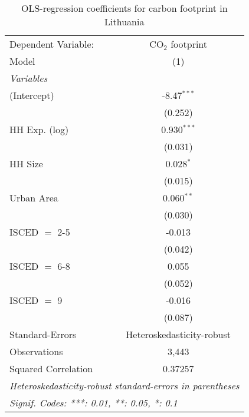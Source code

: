
\begin{table}[htbp!]
   \centering
   \small
   \begin{adjustbox}{width = 1\textwidth, max height = 0.95\textheight, center}
      \begin{threeparttable}[b]
         \caption{\label{tab:OLS_2_LTU} OLS-regression coefficients for carbon footprint in Lithuania}
         \begin{tabular}{lc}
            \tabularnewline \midrule \midrule
            Dependent Variable: & CO$_{2}$ footprint\\  
            Model               & (1)\\  
            \midrule
            \emph{Variables}\\
            (Intercept)         & -8.47$^{***}$\\   
                                & (0.252)\\   
            HH Exp. (log)       & 0.930$^{***}$\\   
                                & (0.031)\\   
            HH Size             & 0.028$^{*}$\\   
                                & (0.015)\\   
            Urban Area          & 0.060$^{**}$\\   
                                & (0.030)\\   
            ISCED $=$ 2-5       & -0.013\\   
                                & (0.042)\\   
            ISCED $=$ 6-8       & 0.055\\   
                                & (0.052)\\   
            ISCED $=$ 9         & -0.016\\   
                                & (0.087)\\   
            \midrule 
            Standard-Errors     & Heteroskedasticity-robust \\   
            Observations        & 3,443\\  
            Squared Correlation & 0.37257\\  
            \midrule \midrule
            \multicolumn{2}{l}{\emph{Heteroskedasticity-robust standard-errors in parentheses}}\\
            \multicolumn{2}{l}{\emph{Signif. Codes: ***: 0.01, **: 0.05, *: 0.1}}\\
         \end{tabular}
         

\end{threeparttable}
\end{adjustbox}
\end{table}
